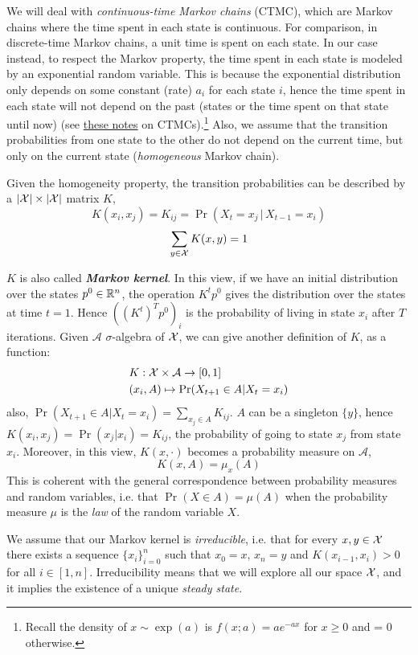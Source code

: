 We will deal with \emph{continuous-time Markov chains} (CTMC), which are Markov chains where the time spent in each state is continuous. For comparison, in discrete-time Markov chains, a unit time is spent on each state. In our case instead, to respect the Markov property, the time spent in each state is modeled by an exponential random variable. This is because the exponential distribution only depends on some constant (rate) $a_i$ for each state $i$, hence the time spent in each state will not depend on the past (states or the time spent on that state until now) (see \href{https://www.columbia.edu/~ks20/stochastic-I/stochastic-I-CTMC.pdf}{these notes} on CTMCs).\footnote{Recall the density of $x \sim \exp(a)$ is $f(x;a)=a e^{-ax}$ for $x \ge 0$ and = 0 otherwise.}
Also, we assume that the transition probabilities from one state to the other do not depend on the current time, but only on the current state (\emph{homogeneous} Markov chain). 


Given the homogeneity property, the transition probabilities can be described by a $|\mathcal{X}| \times |\mathcal{X}|$ matrix $K$,
\[
K(x_i, x_j) = K_{ij}= \Pr( X_t = x_j\,|\, X_{t-1} = x_i)
\]
\[
\sum_{y\in\mathcal{X}}K(x,y)=1
\]

$K$ is also called \textbf{\emph{Markov kernel}}. In this view, if we have an initial distribution over the states $p^0 \in \mathbb{R}^n$, the operation $K^tp^0$ gives the distribution over the states at time $t=1$. Hence $((K^t)^Tp^0)_i$ is the probability of living in state $x_i$ after $T$ iterations. 
Given $\mathcal{A}$ $\sigma$-algebra of $\mathcal{X}$, we can give another definition of $K$, as a function:
\begin{align*}
    &K: \mathcal{X} \times \mathcal{A} \to [0,1]\\
    &(x_i,A) \mapsto \Pr(X_{t+1} \in A|X_t=x_i)
\end{align*}
also, $\Pr(X_{t+1} \in A|X_t=x_i) = \sum_{x_j\in A} K_{ij}$. $A$ can be a singleton $\{y\}$, hence $K(x_i,x_j)=\Pr(x_j|x_i)=K_{ij}$, the probability of going to state $x_j$ from state $x_i$. Moreover, in this view, $K(x, \cdot)$ becomes a probability measure on $\mathcal{A}$, 
\[
K(x,A)=\mu_x(A)
\]
This is coherent with the general correspondence between probability measures and random variables, i.e. that $\Pr(X\in A)=\mu(A)$ when the probability measure $\mu$ is the \emph{law} of the random variable $X$. 


We assume that our Markov kernel is \emph{irreducible}, i.e. that for every $x,y \in \mathcal{X}$ there exists a sequence $\{x_i\}_{i=0}^n$ such that $x_0=x$, $x_n=y$ and $K(x_{i-1},x_i)>0$ for all $i\in[1,n]$. Irreducibility means that we will explore all our space $\mathcal{X}$, and it implies the existence of a unique \emph{steady state}. 

